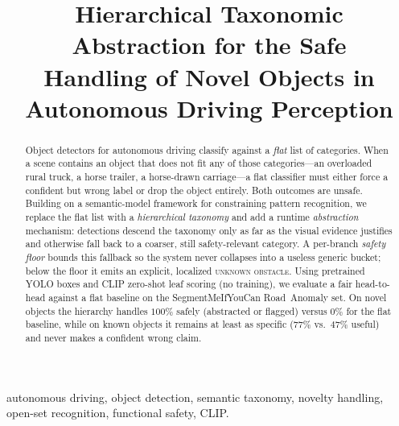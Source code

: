 \documentclass[conference]{IEEEtran}
\begin{document}
\title{Hierarchical Taxonomic Abstraction for the Safe\\
Handling of Novel Objects in Autonomous Driving Perception}

\author{
}

\maketitle

\begin{abstract}
Object detectors for autonomous driving classify against a \emph{flat} list of
categories. When a scene contains an object that does not fit any of those
categories---an overloaded rural truck, a horse trailer, a horse-drawn
carriage---a flat classifier must either force a confident but wrong label or
drop the object entirely. Both outcomes are unsafe. Building on a semantic-model
framework for constraining pattern recognition, we replace the flat list with a
\emph{hierarchical taxonomy} and add a runtime \emph{abstraction} mechanism:
detections descend the taxonomy only as far as the visual evidence justifies and
otherwise fall back to a coarser, still safety-relevant category. A per-branch
\emph{safety floor} bounds this fallback so the system never collapses into a
useless generic bucket; below the floor it emits an explicit, localized
\textsc{unknown obstacle}. Using pretrained YOLO boxes and CLIP zero-shot leaf
scoring (no training), we evaluate a fair head-to-head against a flat baseline on
the SegmentMeIfYouCan Road~Anomaly set. On novel objects the hierarchy handles
$100\%$ safely (abstracted or flagged) versus $0\%$ for the flat baseline, while
on known objects it remains at least as specific ($77\%$ vs.\ $47\%$ useful) and
never makes a confident wrong claim.
\end{abstract}

\begin{IEEEkeywords}
autonomous driving, object detection, semantic taxonomy, novelty handling,
open-set recognition, functional safety, CLIP.
\end{IEEEkeywords}
\end{document}
